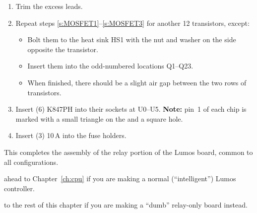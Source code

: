 \documentclass[letterpaper,twoside,onecolumn,openright,final]{memoir}
\begin{document}
\begin{enumerate}
\item\label{s:MOSFET3}
	Trim the excess leads.
\item	Repeat steps \ref{s:MOSFET1}--\ref{s:MOSFET3} for another 12 transistors, except:
	\begin{itemize}
		\item	Bolt them to the heat sink HS1 with the nut and washer on the side opposite the
			transistor.
		\item	Insert them into the odd-numbered locations Q1--Q23.
		\item	When finished, there should be a slight air gap between the two rows of
			transistors.
	\end{itemize}
\item	Insert (6) K847PH  into their sockets at U0--U5.  {\bfseries Note:} pin~1
	of each chip is marked with a small triangle on the  and a square hole.
\item	Insert (3) 10\,A  into the fuse holders.
\end{enumerate}

This completes the assembly of the relay portion of the Lumos board, common to all configurations.

\bigskip

 ahead to Chapter~\ref{ch:cpu} if you are making a normal (``intelligent'') Lumos controller.

\bigskip

 to the rest of this chapter if you are making a ``dumb'' relay-only board instead.
\end{document}
